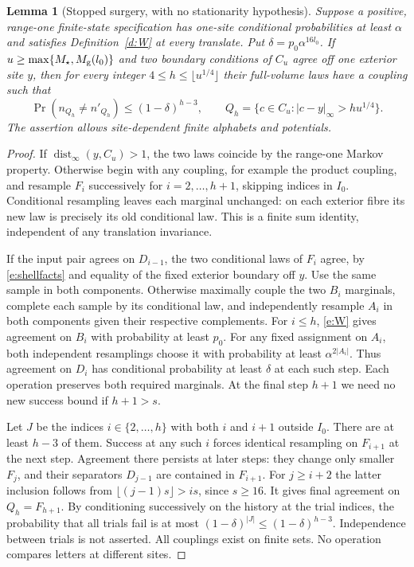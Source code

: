 \documentclass[11pt,reqno]{amsart}
\newtheorem{lemma}[theorem]{Lemma}
\theoremstyle{definition}
\newcommand{\dist}{\operatorname{dist}_\infty}
\begin{document}
\begin{lemma}[Stopped surgery, with no stationarity hypothesis]
\label{l:stopped}
Suppose a positive, range-one finite-state specification has one-site
conditional probabilities at least $\alpha$ and satisfies
Definition~\ref{d:W} at every translate. Put
$\delta=p_0\alpha^{16l_0}$. If
$u\ge\max\{M_\star,M_{\rm g}(l_0)\}$ and two boundary conditions of
$C_u$ agree off one exterior site $y$, then for every integer
$4\le h\le\lfloor u^{1/4}\rfloor$ their full-volume laws have a
coupling such that
\begin{equation}\label{e:stopped}
 \Pr(n_{Q_h}\ne n'_{Q_h})\le(1-\delta)^{h-3},\qquad
 Q_h=\{c\in C_u:|c-y|_\infty>hu^{1/4}\}.
\end{equation}
The assertion allows site-dependent finite alphabets and potentials.
\end{lemma}
\begin{proof}
If $\dist(y,C_u)>1$, the two laws coincide by the range-one Markov
property. Otherwise begin with any coupling, for example the product
coupling, and resample $F_i$ successively for $i=2,\ldots,h+1$,
skipping indices in $I_0$. Conditional resampling leaves each marginal
unchanged: on each exterior fibre its new law is precisely its old
conditional law. This is a finite sum identity, independent of any
translation invariance.

If the input pair agrees on $D_{i-1}$, the two conditional laws of
$F_i$ agree, by \eqref{e:shellfacts} and equality of the fixed exterior
boundary off $y$. Use the same sample in both components. Otherwise
maximally couple the two $B_i$ marginals, complete each sample by its
conditional law, and independently resample $A_i$ in both components
given their respective complements. For $i\le h$, \eqref{e:W} gives
agreement on $B_i$ with probability at least $p_0$. For any fixed
assignment on $A_i$, both independent resamplings choose it with
probability at least $\alpha^{2|A_i|}$. Thus agreement on $D_i$ has
conditional probability at least $\delta$ at each such step. Each
operation preserves both required marginals. At the final step $h+1$
we need no new success bound if $h+1>s$.

Let $J$ be the indices $i\in\{2,\ldots,h\}$ with both $i$ and $i+1$
outside $I_0$. There are at least $h-3$ of them. Success at any such
$i$ forces identical resampling on $F_{i+1}$ at the next step.
Agreement there persists at later steps: they change only smaller
$F_j$, and their separators $D_{j-1}$ are contained in $F_{i+1}$.
For $j\ge i+2$ the latter inclusion follows from
$\lfloor(j-1)s\rfloor>is$, since $s\ge16$. It gives final agreement
on $Q_h=F_{h+1}$. By conditioning successively on the history at the
trial indices, the probability that all trials fail is at most
$(1-\delta)^{|J|}\le(1-\delta)^{h-3}$. Independence between trials is
not asserted. All couplings exist on finite sets. No operation compares
letters at different sites.
\end{proof}
\end{document}
